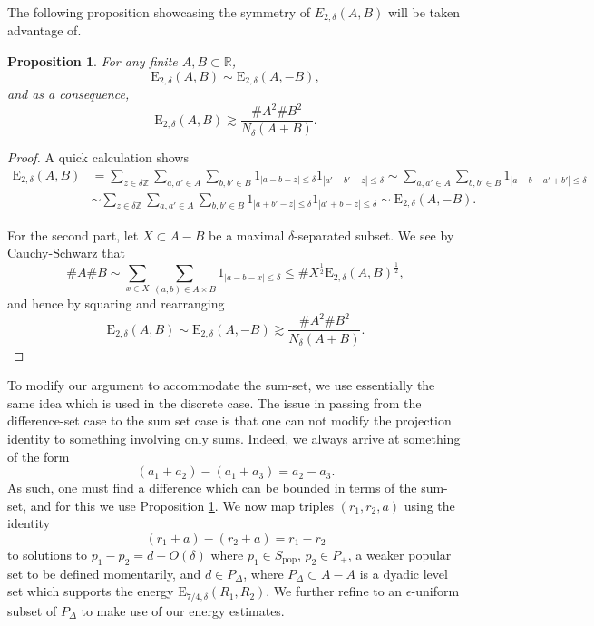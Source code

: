 \documentclass[12pt]{amsart}
\newtheorem{proposition}[theorem]{Proposition}
\newcommand{\1}{\mathbf{1}}
\begin{document}
The following proposition showcasing the symmetry of \(E_{2,\delta} (A,B)\) will be taken advantage of.

\begin{proposition}\label{prop:e2-cauchy-schwarz}
For any finite \(A,B \subset \mathbb{R} \),
\[
	\mathrm{E} _{2,\delta} (A,B) \sim  \mathrm{E} _{2,\delta} (A,-B)
,\]
and as a consequence,
\[
	\mathrm{E} _{2,\delta} (A,B) \gtrsim \frac{\# A ^{2} \# B ^{2}}{N_{\delta} \left( A + B \right) } 
.\]
\end{proposition}
\begin{proof}
A quick calculation shows
\begin{align*}
	\mathrm{E} _{2,\delta} (A,B) & = \sum _{z \in \delta \mathbb{Z} } \sum _{a,a' \in A} \sum _{b,b' \in B} 1_{\left\lvert a - b - z \right\rvert \leq \delta} 1_{\left\lvert a' - b' - z \right\rvert \leq \delta} \sim  \sum _{a,a' \in A} \sum _{b,b' \in B} 1_{\left\lvert a - b - a' + b' \right\rvert \leq \delta} \\
	& \sim \sum _{z \in \delta \mathbb{Z} } \sum _{a,a' \in A} \sum _{b,b' \in B} 1_{\left\lvert a + b' - z \right\rvert \leq \delta} 1_{\left\lvert a' + b - z \right\rvert \leq \delta} \sim \mathrm{E} _{2,\delta} (A,-B).
\end{align*}

For the second part, let \(X \subset A-B\) be a maximal \(\delta\)-separated subset.
We see by Cauchy-Schwarz that
\[
	\# A \# B \sim \sum _{x \in X } \sum _{(a,b)\in A \times B} 1_{\left\lvert a - b - x \right\rvert \leq \delta} \leq \# X ^{\frac{1}{2} } \mathrm{E} _{2,\delta} (A,B)^{\frac{1}{2} }
,\]
and hence by squaring and rearranging
\[
	\mathrm{E} _{2,\delta} (A,B)\sim \mathrm{E} _{2,\delta} (A,-B)\gtrsim \frac{\# A ^{2} \# B^{2}}{N_{\delta} (A + B)} 
.\]
\end{proof}

To modify our argument to accommodate the sum-set, we use essentially the same idea which is used in the
discrete case.
The issue in passing from the difference-set case to the sum set case
is that one can not modify the projection identity to something involving only sums.
Indeed, we always arrive at something of the form
\[
	(a_1 + a_2) - (a_1 +a_3) = a_2- a_3
.\]
As such, one
must find a difference which can be bounded in terms of the sum-set, and for this we use Proposition \ref{prop:e2-cauchy-schwarz}.
We now map triples \((r_1,r_2,a)\) using the identity
\[
	(r_1 + a) - (r_2 + a) = r_1 - r_2
\]
to solutions to \(p_1 - p_2 = d + O(\delta)\) where \(p_1 \in S_{\text{pop}} \), \(p_2 \in P_{+}\), a weaker popular set to be defined momentarily, and \(d \in P_{\Delta} \),
where \(P_{\Delta} \subset A-A\) is a dyadic level set which supports the energy \(\mathrm{E} _{7 / 4, \delta} (R_1,R_2)\).
We further refine to an \(\epsilon\)-uniform subset of \(P_{\Delta} \) to make use of our energy estimates.
\end{document}
